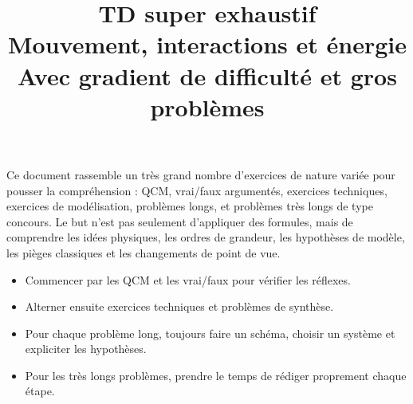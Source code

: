 \documentclass[11pt,a4paper]{article}
\title{\Huge TD super exhaustif\\[0.3em]\LARGE Mouvement, interactions et énergie\\[0.2em]\large Avec gradient de difficulté et gros problèmes}
\author{}
\date{}
\begin{document}
\maketitle
\tableofcontents

\begin{bloc}[Objectif]
Ce document rassemble un très grand nombre d'exercices de nature variée pour pousser la compréhension :
QCM, vrai/faux argumentés, exercices techniques, exercices de modélisation, problèmes longs, et problèmes très longs de type concours.
Le but n'est pas seulement d'appliquer des formules, mais de comprendre les idées physiques, les ordres de grandeur, les hypothèses de modèle, les pièges classiques et les changements de point de vue.
\end{bloc}

\begin{bloc}
\begin{itemize}
\item Commencer par les QCM et les vrai/faux pour vérifier les réflexes.
\item Alterner ensuite exercices techniques et problèmes de synthèse.
\item Pour chaque problème long, toujours faire un schéma, choisir un système et expliciter les hypothèses.
\item Pour les très longs problèmes, prendre le temps de rédiger proprement chaque étape.
\end{itemize}
\end{bloc}
\end{document}
